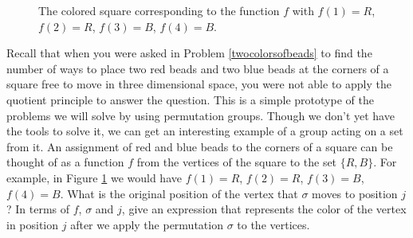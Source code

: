  \begin{figure}[htb]\caption{The colored square corresponding to the
function $f$ with $f(1) =R$, $f(2)
= R$,
$f(3)=B$, $f(4)=B$.}\label{ColoredSquare}\smallskip
\begin{center}\mbox{}
\vspace*{-.3in}
\end{center}  
\end{figure}
\iteme Recall that when you were asked in Problem \ref{twocolorsofbeads} to
find the number of ways to place two red beads and two blue beads at the
corners of a square free to move in three dimensional space, you were
not able to apply the quotient principle to answer the question.  This is
a simple prototype of the problems we will solve by using permutation
groups.  Though we don't yet have the tools to solve it, we can get an
interesting example of a group acting on a set from it.  An assignment of
red and blue beads to the corners of a square can be thought of as a
function $f$ from the vertices of the square to the set $\{R,B\}$.  
For example, in Figure \ref{ColoredSquare} we would have $f(1) =R$, $f(2)
= R$,
$f(3)=B$, $f(4)=B$.  What is the original position of the vertex that
$\sigma$ moves to position
$j$?  In terms of $f$, $\sigma$ and $j$, give an expression that
represents the color of the vertex in position $j$ after we apply the
permutation
$\sigma$ to the vertices.\label{actiononfunctions}

